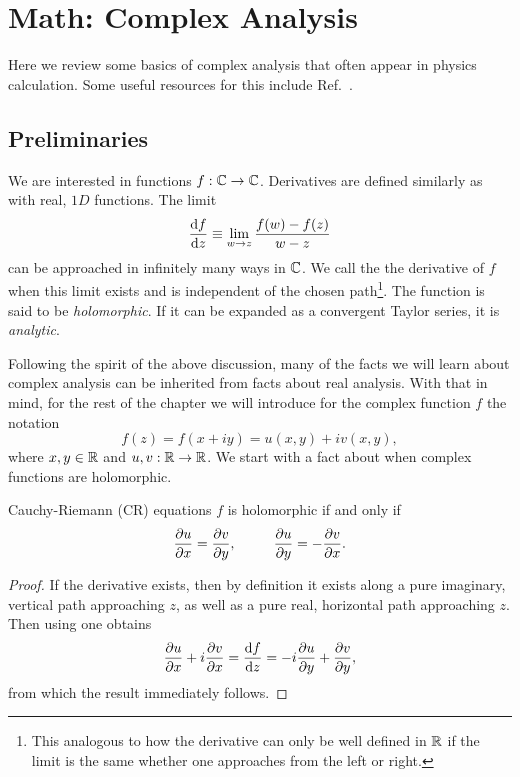 \chapter{Math: Complex Analysis} 

Here we review some basics of complex analysis that often appear in physics
calculation. Some useful resources for this include
Ref.~\cite{brown_complex_2003,weber_essentials_2012}.


\section{Preliminaries}

We are interested in functions $f:\mathbb{C}\to\mathbb{C}$. Derivatives are defined similarly as
with real, $1D$ functions. The limit
\begin{equation}\label{eq:cderiv}
  \dv{f}{z}\equiv\lim_{w\to z}\frac{f(w)-f(z)}{w-z}
\end{equation}
can be approached in infinitely many ways in $\mathbb{C}$. We call  the
the derivative of $f$ when this limit exists and is independent of the chosen
path\footnote{This analogous to how the derivative can only be well defined in
$\mathbb{R}$ if the limit is the same whether one approaches from the left or right.}.
The function is said to be {\it holomorphic}. If it can be expanded as a
convergent Taylor series, it is {\it analytic}.

Following the spirit of the above discussion, many of the facts we will learn
about complex analysis can be inherited from facts about real analysis. With
that in mind, for the rest of the chapter we will introduce for the complex
function $f$ the notation
\begin{equation}
  f(z)=f(x+iy)=u(x,y)+iv(x,y),
\end{equation}
where $x,y\in\mathbb{R}$ and $u,v:\mathbb{R}\to\mathbb{R}$. We start with a fact about when complex
functions are holomorphic.
\begin{theorem}{Cauchy-Riemann (CR) equations}{}
$f$ is holomorphic if and only if
$$
  \pdv{u}{x}=\pdv{v}{y},~~~~~~~~\pdv{u}{y}=-\pdv{v}{x}.
$$
\begin{proof}
If the derivative exists, then by definition
it exists along a pure imaginary, vertical path approaching $z$, as well
as a pure real, horizontal path approaching $z$.
Then using  one obtains
$$
\pdv{u}{x}+i\pdv{v}{x}=\dv{f}{z}=-i\pdv{u}{y}+\pdv{v}{y},
$$
from which the result immediately follows.
\end{proof}
\end{theorem}


